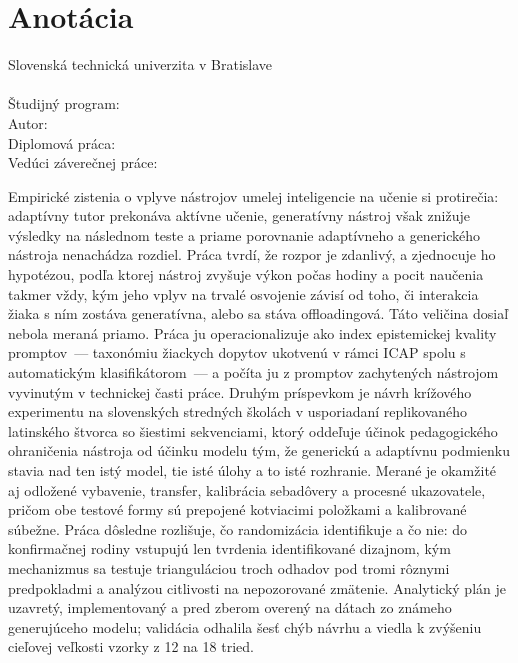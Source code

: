 \newpage

\section*{Anotácia}

Slovenská technická univerzita v Bratislave \\
\myFacultySK \\[4pt]
Študijný program: \myStudyProgramSK \\
Autor: \myName \\
Diplomová práca: \myTitleSK \\
Vedúci záverečnej práce: \mySupervisor \\
\myDateSK

\vspace{8pt}

Empirické zistenia o vplyve nástrojov umelej inteligencie na učenie si protirečia: adaptívny tutor prekonáva aktívne učenie, generatívny nástroj však znižuje výsledky na následnom teste a priame porovnanie adaptívneho a generického nástroja nenachádza rozdiel. Práca tvrdí, že rozpor je zdanlivý, a zjednocuje ho hypotézou, podľa ktorej nástroj zvyšuje výkon počas hodiny a pocit naučenia takmer vždy, kým jeho vplyv na trvalé osvojenie závisí od toho, či interakcia žiaka s ním zostáva generatívna, alebo sa stáva offloadingová. Táto veličina dosiaľ nebola meraná priamo. Práca ju operacionalizuje ako index epistemickej kvality promptov~--- taxonómiu žiackych dopytov ukotvenú v rámci ICAP spolu s automatickým klasifikátorom~--- a počíta ju z promptov zachytených nástrojom vyvinutým v technickej časti práce. Druhým príspevkom je návrh krížového experimentu na slovenských stredných školách v usporiadaní replikovaného latinského štvorca so šiestimi sekvenciami, ktorý oddeľuje účinok pedagogického ohraničenia nástroja od účinku modelu tým, že generickú a adaptívnu podmienku stavia nad ten istý model, tie isté úlohy a to isté rozhranie. Merané je okamžité aj odložené vybavenie, transfer, kalibrácia sebadôvery a procesné ukazovatele, pričom obe testové formy sú prepojené kotviacimi položkami a kalibrované súbežne. Práca dôsledne rozlišuje, čo randomizácia identifikuje a čo nie: do konfirmačnej rodiny vstupujú len tvrdenia identifikované dizajnom, kým mechanizmus sa testuje trianguláciou troch odhadov pod tromi rôznymi predpokladmi a analýzou citlivosti na nepozorované zmätenie. Analytický plán je uzavretý, implementovaný a pred zberom overený na dátach zo známeho generujúceho modelu; validácia odhalila šesť chýb návrhu a viedla k zvýšeniu cieľovej veľkosti vzorky z 12 na 18 tried.

